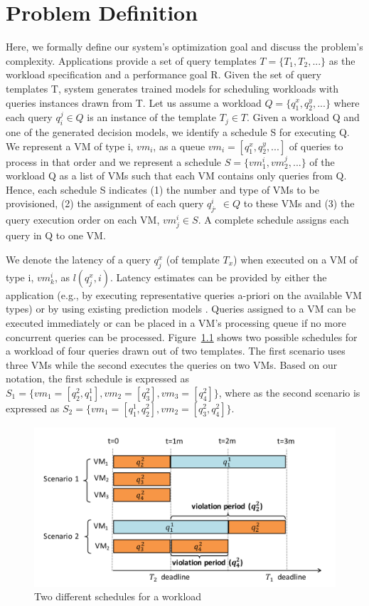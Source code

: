 \chapter{Problem Definition}

Here, we formally define our system’s optimization goal and discuss the problem’s complexity. Applications provide a set of query templates \(T = \{T_1, T_2, . . .\}\) as the workload specification and a performance goal R. Given the set of query templates T,  system generates trained models for scheduling workloads with queries instances drawn from T. Let us assume a workload \(Q = \{q_1^x , q_2^y , . . . \}\) where each query \(q^j_i \in Q\) is an instance of the template \(T_j \in T\). Given a workload Q and one of the generated decision models, we identify a schedule S for executing Q. We represent a VM of type i, \(vm_i\), as a queue \(vm_i = [q_1^x, q_2^y, . . .]\) of queries to process in that order and we represent a schedule \(S = \{vm_1^i, vm_2^j , . . . \}\) of the workload Q as a list of VMs such that each VM contains only queries from Q. Hence, each schedule S indicates (1) the number and type of VMs to be provisioned, (2) the assignment of each query  \(q_j^ị \in Q\) to these VMs and (3) the query execution order on each VM, \(vm^i_j \in S\). A complete schedule assigns each query in Q to one VM. 

We denote the latency of a query \(q^x_j\) (of template \(T_x\)) when executed on a VM of type i, \(vm^i_k\), as \(l(q^x_j , i)\). Latency estimates can be provided by either the application (e.g., by executing representative queries a-priori on the available VM types) or by using existing prediction models . Queries assigned to a VM can be executed immediately or can be placed in a VM’s processing queue if no more concurrent queries can be processed.
Figure~\ref{fig:Sche} shows two possible schedules for a workload of four queries drawn out of two templates. The first scenario uses three VMs while the second executes the queries on two VMs. Based on our notation, the first schedule is expressed as \(S_1 = \{vm_1 = [q^2_2, q^1_1], vm_2 = [q^2_3], vm_3 = [q^2_4]\}\), where as the second scenario is expressed as \(S_2 = \{vm_1 = [q^1_1, q^2_2], vm_2 = [q^2_3, q^2_4]\}\).
\begin{figure}
\centering
\includegraphics[width=1.0\textwidth]{schedule.png}
\caption{\label{fig:Sche}Two different schedules for a workload}
\end{figure}
